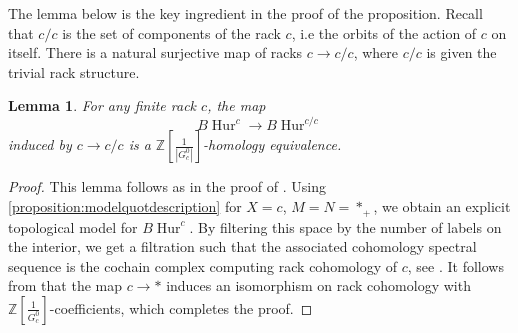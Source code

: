 \documentclass[12 pt]{amsart}
\theoremstyle{plain}
\newtheorem{lemma}[theorem]{Lemma}
\theoremstyle{definition}
\theoremstyle{remark}
\numberwithin{equation}{section}
\DeclareMathOperator\Hur{Hur}
\DeclareMathOperator\Conf{Conf}
\newcommand\ZZ{\mathbb{Z}}
\begin{document}
The lemma below is the key ingredient in the proof of the proposition. Recall that $c/c$ is the set of components of the rack $c$, i.e the orbits of the action of $c$ on itself. There is a natural surjective map of racks $c \to c/c$, where $c/c$ is given the trivial rack structure.
\begin{lemma}\label{lemma:rackhomologyequivalence}
	For any finite rack $c$, the map 
	$$B\Hur^c \to B\Hur^{c/c}$$
	induced by $c \to c/c$ is a $\ZZ[\frac 1 {|G^0_c|}]$-homology equivalence.
\end{lemma}

\begin{proof}
		 This lemma follows as in the proof of \cite[Corollary
		 5.4]{randal-williams:homology-of-hurwitz-spaces}. Using
		 \autoref{proposition:modelquotdescription} for $X = c$, $M=N=*_+$,
		 we obtain an explicit topological model for $B\Hur^c$. By
		 filtering this space by the number of labels on the interior,
		 we get a filtration such that the associated cohomology
		 spectral sequence is the cochain complex computing rack
		 cohomology of $c$, see \cite{etingof2003rack}. It follows from \cite[Theorem 4.2]{etingof2003rack} that the map $c \to *$ induces an isomorphism on rack cohomology with $\ZZ[\frac 1 {G^0_c}]$-coefficients, which completes the proof.
\end{proof}
\end{document}
